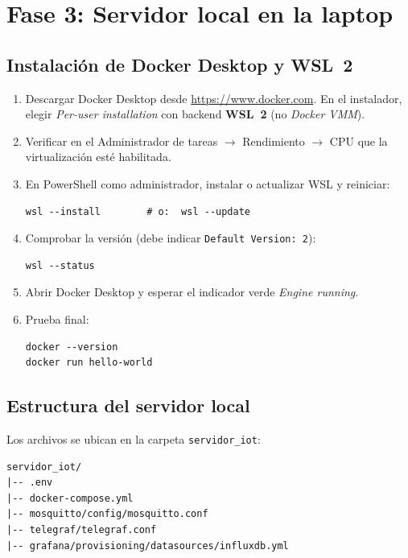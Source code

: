 \documentclass[11pt,a4paper]{article}
\newcommand{\arch}[1]{\texttt{#1}}
\begin{document}
\section{Fase 3: Servidor local en la laptop}

\subsection{Instalaci\'on de Docker Desktop y WSL~2}

\begin{enumerate}
  \item Descargar Docker Desktop desde \url{https://www.docker.com}. En el instalador,
        elegir \emph{Per-user installation} con backend \textbf{WSL~2} (no \emph{Docker VMM}).
  \item Verificar en el Administrador de tareas $\rightarrow$ Rendimiento $\rightarrow$ CPU
        que la virtualizaci\'on est\'e habilitada.
  \item En PowerShell como administrador, instalar o actualizar WSL y reiniciar:
\begin{lstlisting}[style=bash]
wsl --install        # o:  wsl --update
\end{lstlisting}
  \item Comprobar la versi\'on (debe indicar \texttt{Default Version: 2}):
\begin{lstlisting}[style=bash]
wsl --status
\end{lstlisting}
  \item Abrir Docker Desktop y esperar el indicador verde \emph{Engine running}.
  \item Prueba final:
\begin{lstlisting}[style=bash]
docker --version
docker run hello-world
\end{lstlisting}
\end{enumerate}

\subsection{Estructura del servidor local}

Los archivos se ubican en la carpeta \arch{servidor\_iot}:

\begin{lstlisting}[style=plano]
servidor_iot/
|-- .env
|-- docker-compose.yml
|-- mosquitto/config/mosquitto.conf
|-- telegraf/telegraf.conf
|-- grafana/provisioning/datasources/influxdb.yml
\end{lstlisting}
\end{document}
